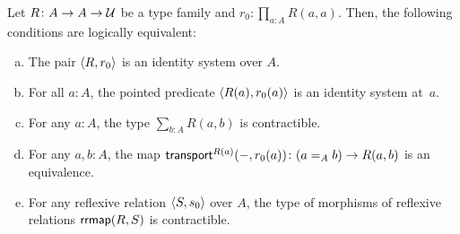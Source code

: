 \begin{thm}\label{thm:global-identity-system-equivalences}
    Let\/ $R\colon A\to A\to\univ$ be a type family and\/ $r_0\colon\prod_{a\colon A}R(a,a)$. Then, the following conditions are logically equivalent:
    \begin{enumerate}[a),font=\upshape]
        \item The pair\/ $\langle R,r_0\rangle$ is an identity system over\/ $A$.
        
        \item For all\/ $a\colon A$, the pointed predicate\/ $\langle R(a),r_0(a)\rangle$ is an identity system at\/~$a$.
        
        \item For any\/ $a\colon A$, the type\/ $\sum_{b\colon A}R(a,b)$ is contractible.
        
        \item For any\/ $a,b\colon A$, the map\/ $\fun{transport}^{R(a)}(\dummy,r_0(a))\colon(a\eq{A}b)\to R(a,b)$ is an equivalence.
        
        \item For any reflexive relation\/ $\langle S,s_0\rangle$ over\/ $A$, the type of morphisms of reflexive relations\/ $\mathsf{rrmap}(R,S)$ is contractible.
    \end{enumerate}
\end{thm}

